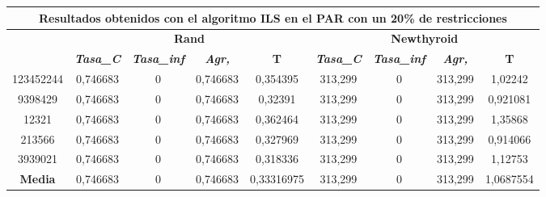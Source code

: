 \documentclass[12pt, spanish]{article}
\begin{document}
\begin{table}[H]
\begin{tabular}{|c|c|c|c|c|c|c|c|c|}
\hline
\multicolumn{9}{|c|}{\textbf{Resultados obtenidos con el algoritmo ILS en el PAR con un 20\% de restricciones}}                                                                                                   \\ \hline
\multirow{2}{*}{} & \multicolumn{4}{c|}{\textbf{Rand}}                                                            & \multicolumn{4}{c|}{\textbf{Newthyroid}}                                                      \\ \cline{2-9} 
                  & \textit{\textbf{Tasa\_C}} & \textit{\textbf{Tasa\_inf}} & \textit{\textbf{Agr,}} & \textbf{T} & \textit{\textbf{Tasa\_C}} & \textit{\textbf{Tasa\_inf}} & \textit{\textbf{Agr,}} & \textbf{T} \\ \hline
123452244         & 0,746683                  & 0                           & 0,746683               & 0,354395   & 313,299                   & 0                           & 313,299                & 1,02242    \\ \hline
9398429           & 0,746683                  & 0                           & 0,746683               & 0,32391    & 313,299                   & 0                           & 313,299                & 0,921081   \\ \hline
12321             & 0,746683                  & 0                           & 0,746683               & 0,362464   & 313,299                   & 0                           & 313,299                & 1,35868    \\ \hline
213566            & 0,746683                  & 0                           & 0,746683               & 0,327969   & 313,299                   & 0                           & 313,299                & 0,914066   \\ \hline
3939021           & 0,746683                  & 0                           & 0,746683               & 0,318336   & 313,299                   & 0                           & 313,299                & 1,12753    \\ \hline
\textbf{Media}    & 0,746683                  & 0                           & 0,746683               & 0,33316975 & 313,299                   & 0                           & 313,299                & 1,0687554  \\ \hline
\end{tabular}
\end{table}
\end{document}
